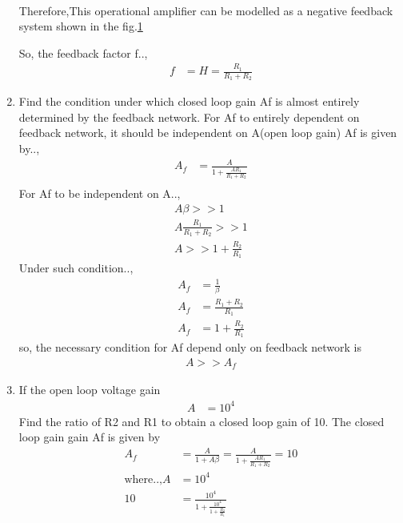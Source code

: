 \begin{enumerate}[label=\thesubsection.\arabic*.,ref=\thesubsection.\theenumi]
\begin{align}
\end{align}
Therefore,This operational amplifier can be modelled as a negative feedback system shown in the fig.\ref{fig:equivalent_control_system}
\begin{figure}[!ht]
	\begin{center}
			\resizebox{\columnwidth}{!}{}
	\end{center}
\caption{}
\label{fig:equivalent_control_system}
\end{figure}
So, the feedback factor f..,
\begin{align}
     f &= H = \frac{R_1}{R_1+R_2}
\end{align}
\item Find the condition under which closed loop gain Af is almost entirely determined by the feedback network.
\solution For Af to entirely dependent on feedback network, it should be independent on A(open loop gain)
Af is given by..,
\begin{align}
    A_f &= \frac{A}{1+\frac{AR_1}{R_1+R_2}} \\
\end{align}
For Af to be independent on A..,
\begin{align}
 A\beta >> 1 \\
 A\frac{R_1}{R_1+R_2} >> 1 \\
 A >> 1 + \frac{R_2}{R_1} 
\end{align}
Under such condition..,
\begin{align}
    A_f &= \frac{1}{\beta} \\
    A_f &= \frac{R_1+R_2}{R_1}\\
    A_f &= 1+\frac{R_2}{R_1}
\end{align}
so, the necessary condition for Af depend only on feedback network is
\begin{align}
    A >> A_f
\end{align}
\item If the open loop voltage gain
\begin{align} 
A & = 10^4
\end{align}
Find the ratio of R2 and R1 to obtain a closed loop gain of 10.
\solution The closed loop gain gain Af is given by
\begin{align}
    A_f &= \frac{A}{1+A\beta}
        = \frac{A}{1+\frac{AR_1}{R_1+R_2}} = 10\\
    \text{where..,} A &= 10^4 \\
    10 &= \frac{10^4}{1+\frac{10^4}{1+\frac{R_2}{R_1}}}\\

\end{align}
\end{enumerate}
